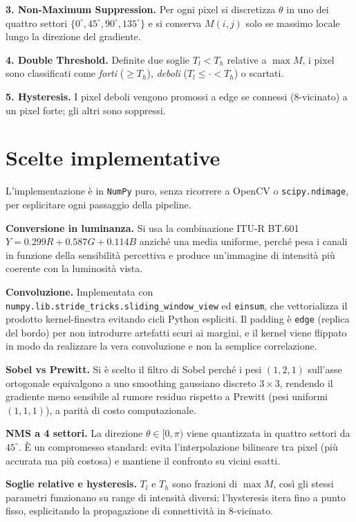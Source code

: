 \documentclass[conference,9pt]{IEEEtran}
\begin{document}
\textbf{3. Non-Maximum Suppression.} Per ogni pixel si discretizza $\theta$ in
uno dei quattro settori $\{0^\circ,45^\circ,90^\circ,135^\circ\}$ e si conserva
$M(i,j)$ solo se massimo locale lungo la direzione del gradiente.

\textbf{4. Double Threshold.} Definite due soglie $T_l<T_h$ relative a
$\max M$, i pixel sono classificati come \emph{forti} ($\ge T_h$),
\emph{deboli} ($T_l\le \cdot < T_h$) o scartati.

\textbf{5. Hysteresis.} I pixel deboli vengono promossi a edge se connessi
(8-vicinato) a un pixel forte; gli altri sono soppressi.

\section{Scelte implementative}
L'implementazione \`e in \texttt{NumPy} puro, senza ricorrere a OpenCV o
\texttt{scipy.ndimage}, per esplicitare ogni passaggio della pipeline.

\textbf{Conversione in luminanza.} Si usa la combinazione ITU-R BT.601
$Y=0.299R+0.587G+0.114B$ anzich\'e una media uniforme, perch\'e pesa i canali
in funzione della sensibilit\`a percettiva e produce un'immagine di intensit\`a
pi\`u coerente con la luminosit\`a vista.

\textbf{Convoluzione.} Implementata con
\texttt{numpy.lib.stride\_tricks.sliding\_window\_view} ed
\texttt{einsum}, che vettorializza il prodotto kernel-finestra evitando
cicli Python espliciti. Il padding \`e \texttt{edge} (replica del bordo) per
non introdurre artefatti scuri ai margini, e il kernel viene flippato in modo
da realizzare la vera convoluzione e non la semplice correlazione.

\textbf{Sobel vs Prewitt.} Si \`e scelto il filtro di Sobel perch\'e i pesi
$(1,2,1)$ sull'asse ortogonale equivalgono a uno smoothing gaussiano discreto
$3\times 3$, rendendo il gradiente meno sensibile al rumore residuo rispetto a
Prewitt (pesi uniformi $(1,1,1)$), a parit\`a di costo computazionale.

\textbf{NMS a 4 settori.} La direzione $\theta\in[0,\pi)$ viene quantizzata in
quattro settori da $45^\circ$. \`E un compromesso standard: evita
l'interpolazione bilineare tra pixel (pi\`u accurata ma pi\`u costosa) e
mantiene il confronto su vicini esatti.

\textbf{Soglie relative e hysteresis.} $T_l$ e $T_h$ sono frazioni di
$\max M$, cos\`i gli stessi parametri funzionano su range di intensit\`a
diversi; l'hysteresis itera fino a punto fisso, esplicitando la propagazione
di connettivit\`a in 8-vicinato.
\end{document}
